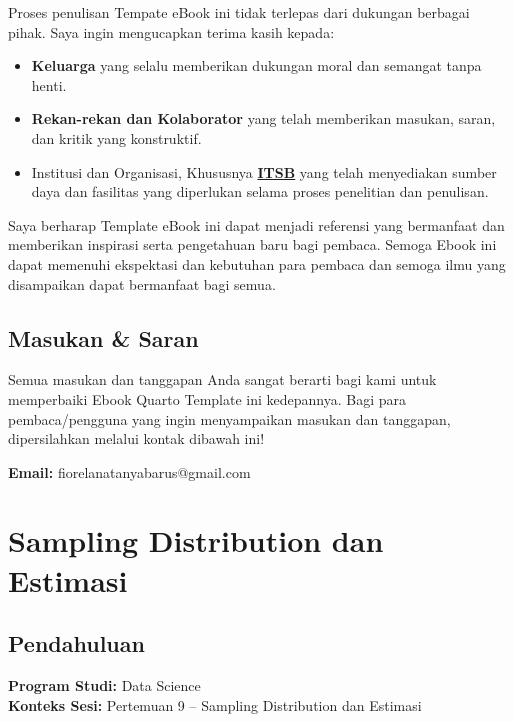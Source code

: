 \documentclass[
  indonesian,
  letterpaper,
]{book}
\providecommand{\tightlist}{%
  \setlength{\itemsep}{0pt}\setlength{\parskip}{0pt}}
\begin{document}

Proses penulisan Tempate eBook ini tidak terlepas dari dukungan berbagai
pihak. Saya ingin mengucapkan terima kasih kepada:

\begin{itemize}
\tightlist
\item
  \textbf{Keluarga} yang selalu memberikan dukungan moral dan semangat
  tanpa henti.
\item
  \textbf{Rekan-rekan dan Kolaborator} yang telah memberikan masukan,
  saran, dan kritik yang konstruktif.
\item
  Institusi dan Organisasi, Khususnya
  \textbf{\href{https://itsb.ac.id/}{ITSB}} yang telah menyediakan
  sumber daya dan fasilitas yang diperlukan selama proses penelitian dan
  penulisan.
\end{itemize}

Saya berharap Template eBook ini dapat menjadi referensi yang bermanfaat
dan memberikan inspirasi serta pengetahuan baru bagi pembaca. Semoga
Ebook ini dapat memenuhi ekspektasi dan kebutuhan para pembaca dan
semoga ilmu yang disampaikan dapat bermanfaat bagi semua.

\section*{Masukan \& Saran}\label{masukan-saran}


Semua masukan dan tanggapan Anda sangat berarti bagi kami untuk
memperbaiki Ebook Quarto Template ini kedepannya. Bagi para
pembaca/pengguna yang ingin menyampaikan masukan dan tanggapan,
dipersilahkan melalui kontak dibawah ini!

\textbf{Email:} fiorelanatanyabarus@gmail.com


\chapter{Sampling Distribution dan
Estimasi}\label{sampling-distribution-dan-estimasi}

\section{Pendahuluan}\label{pendahuluan}

\textbf{Program Studi:} Data Science\\
\textbf{Konteks Sesi:} Pertemuan 9 -- Sampling Distribution dan Estimasi
\end{document}

